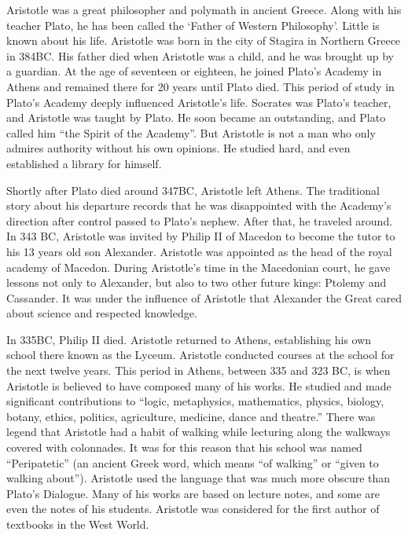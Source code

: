\documentclass{article}
\begin{document}
Aristotle was a great philosopher and polymath in ancient Greece. Along with his teacher Plato, he has been called the `Father of Western Philosophy'. Little is known about his life. Aristotle was born in the city of Stagira in Northern Greece in 384BC. His father died when Aristotle was a child, and he was brought up by a guardian. At the age of seventeen or eighteen, he joined Plato's Academy in Athens and remained there for 20 years until Plato died. This period of study in Plato's Academy deeply influenced Aristotle's life. Socrates was Plato's teacher, and Aristotle was taught by Plato. He soon became an outstanding, and Plato called him ``the Spirit of the Academy''. But Aristotle is not a man who only admires authority without his own opinions. He studied hard, and even established a library for himself.

Shortly after Plato died around 347BC, Aristotle left Athens. The traditional story about his departure records that he was disappointed with the Academy's direction after control passed to Plato's nephew. After that, he traveled around. In 343 BC, Aristotle was invited by Philip II of Macedon to become the tutor to his 13 years old son Alexander. Aristotle was appointed as the head of the royal academy of Macedon. During Aristotle's time in the Macedonian court, he gave lessons not only to Alexander, but also to two other future kings: Ptolemy and Cassander. It was under the influence of Aristotle that Alexander the Great cared about science and respected knowledge.

In 335BC, Philip II died. Aristotle returned to Athens, establishing his own school there known as the Lyceum. Aristotle conducted courses at the school for the next twelve years. This period in Athens, between 335 and 323 BC, is when Aristotle is believed to have composed many of his works. He studied and made significant contributions to ``logic, metaphysics, mathematics, physics, biology, botany, ethics, politics, agriculture, medicine, dance and theatre.'' There was legend that Aristotle had a habit of walking while lecturing along the walkways covered with colonnades. It was for this reason that his school was named ``Peripatetic'' (an ancient Greek word, which means ``of walking'' or ``given to walking about''). Aristotle used the language that was much more obscure than Plato's Dialogue. Many of his works are based on lecture notes, and some are even the notes of his students. Aristotle was considered for the first author of textbooks in the West World.
\end{document}
